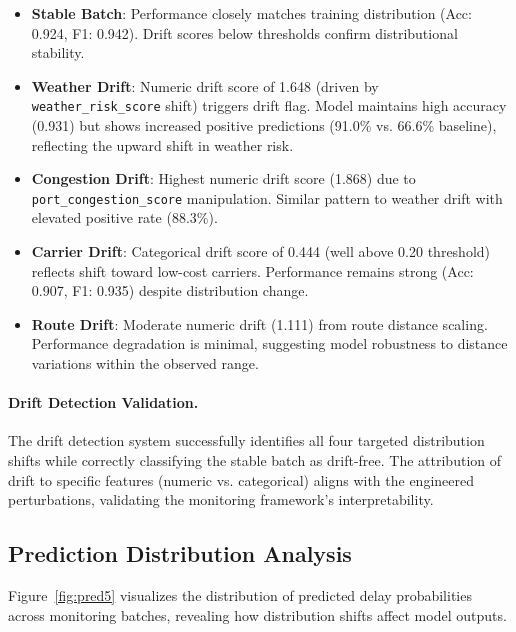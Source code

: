 \documentclass[11pt,a4paper]{article}
\begin{document}
\begin{itemize}
    \item \textbf{Stable Batch}: Performance closely matches training distribution (Acc: 0.924, F1: 0.942). Drift scores below thresholds confirm distributional stability.
    
    \item \textbf{Weather Drift}: Numeric drift score of 1.648 (driven by \texttt{weather\_risk\_score} shift) triggers drift flag. Model maintains high accuracy (0.931) but shows increased positive predictions (91.0\% vs. 66.6\% baseline), reflecting the upward shift in weather risk.
    
    \item \textbf{Congestion Drift}: Highest numeric drift score (1.868) due to \texttt{port\_congestion\_score} manipulation. Similar pattern to weather drift with elevated positive rate (88.3\%).
    
    \item \textbf{Carrier Drift}: Categorical drift score of 0.444 (well above 0.20 threshold) reflects shift toward low-cost carriers. Performance remains strong (Acc: 0.907, F1: 0.935) despite distribution change.
    
    \item \textbf{Route Drift}: Moderate numeric drift (1.111) from route distance scaling. Performance degradation is minimal, suggesting model robustness to distance variations within the observed range.
\end{itemize}

\paragraph{Drift Detection Validation.}
The drift detection system successfully identifies all four targeted distribution shifts while correctly classifying the stable batch as drift-free. The attribution of drift to specific features (numeric vs. categorical) aligns with the engineered perturbations, validating the monitoring framework's interpretability.

\subsection{Prediction Distribution Analysis}

Figure~\ref{fig:pred5} visualizes the distribution of predicted delay probabilities across monitoring batches, revealing how distribution shifts affect model outputs.
\end{document}
